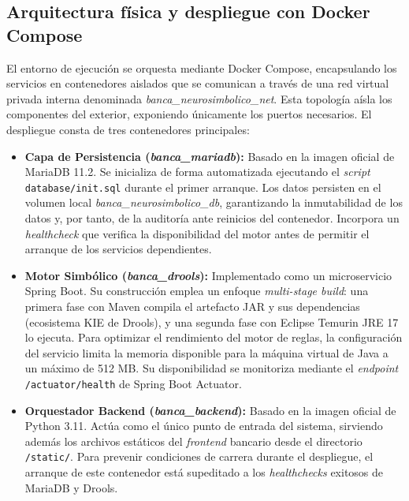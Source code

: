 \documentclass[12pt,a4paper]{report}
\begin{document}
\subsection{Arquitectura física y despliegue con Docker Compose}

El entorno de ejecución se orquesta mediante Docker Compose, encapsulando los servicios en contenedores aislados que se comunican a través de una red virtual privada interna denominada \textit{banca\_neurosimbolico\_net}. Esta topología aísla los componentes del exterior, exponiendo únicamente los puertos necesarios. El despliegue consta de tres contenedores principales:

\begin{itemize}
\item \textbf{Capa de Persistencia (\textit{banca\_mariadb}):} Basado en la imagen oficial de MariaDB 11.2. Se inicializa de forma automatizada ejecutando el \textit{script} \texttt{database/init.sql} durante el primer arranque. Los datos persisten en el volumen local \textit{banca\_neurosimbolico\_db}, garantizando la inmutabilidad de los datos y, por tanto, de la auditoría ante reinicios del contenedor. Incorpora un \textit{healthcheck} que verifica la disponibilidad del motor antes de permitir el arranque de los servicios dependientes.

\item \textbf{Motor Simbólico (\textit{banca\_drools}):} Implementado como un microservicio Spring Boot. Su construcción emplea un enfoque \textit{multi-stage build}: una primera fase con Maven compila el artefacto JAR y sus dependencias (ecosistema KIE de Drools), y una segunda fase con Eclipse Temurin JRE 17 lo ejecuta. Para optimizar el rendimiento del motor de reglas, la configuración del servicio limita la memoria disponible para la máquina virtual de Java a un máximo de 512 MB. Su disponibilidad se monitoriza mediante el \textit{endpoint} \texttt{/actuator/health} de Spring Boot Actuator.

\item \textbf{Orquestador Backend (\textit{banca\_backend}):} Basado en la imagen oficial de Python 3.11. Actúa como el único punto de entrada del sistema, sirviendo además los archivos estáticos del \textit{frontend} bancario desde el directorio \texttt{/static/}. Para prevenir condiciones de carrera durante el despliegue, el arranque de este contenedor está supeditado a los \textit{healthchecks} exitosos de MariaDB y Drools.
\end{itemize}
\end{document}
